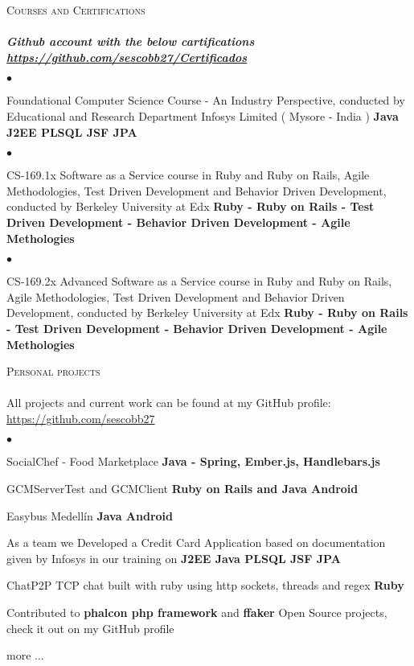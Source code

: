 \documentclass[a4paper]{article}
\newcommand{\lineunder}{\vspace*{-8pt} \\ \hspace*{-18pt} \hrulefill \\}
\newcommand{\header}[1]{{\hspace*{-15pt}\vspace*{6pt}
\textsc{#1}} \vspace*{-6pt} \lineunder}
\newenvironment{achievements}{\begin{list}{$\bullet$}{\topsep 0pt \itemsep
-2pt}}{\vspace*{4pt}\end{list}}
\newcommand{\programming}[1]{{\textbf{#1}}}
\newcommand{\emphasys}[1]{\textbf{\emph{#1}}}
\begin{document}
\newpage
\header{Courses and Certifications}
\emphasys{Github account with the below cartifications \url{https://github.com/sescobb27/Certificados}}
\begin{achievements}
\item Foundational Computer Science Course - An Industry Perspective, conducted by Educational and Research Department Infosys Limited ( Mysore - India )
\programming{Java J2EE PLSQL JSF JPA}
\end{achievements}
\begin{achievements}
\item{CS-169.1x Software as a Service course in Ruby and Ruby on Rails, Agile Methodologies, Test Driven Development and Behavior Driven Development, conducted by Berkeley University at Edx}
\programming{Ruby - Ruby on Rails - Test Driven Development - Behavior Driven Development - Agile Methologies}
\end{achievements}
\begin{achievements}
\item{CS-169.2x Advanced Software as a Service course in Ruby and Ruby on Rails, Agile Methodologies, Test Driven Development and Behavior Driven Development, conducted by Berkeley University at Edx}
\programming{Ruby - Ruby on Rails - Test Driven Development - Behavior Driven Development - Agile Methologies}
\end{achievements}

\header{Personal projects}
All projects and current work can be found at my GitHub profile: \url{https://github.com/sescobb27}
\begin{achievements}
\item{SocialChef - Food Marketplace} \programming{Java - Spring, Ember.js, Handlebars.js}
\item{GCMServerTest and GCMClient} \programming{Ruby on Rails and Java Android}
\item{Easybus Medell\'in }\programming{Java Android}
\item{As a team we Developed a Credit Card Application based on documentation given by Infosys in our training on \programming{J2EE Java PLSQL JSF JPA}}
\item{ChatP2P TCP chat built with ruby using http sockets, threads and regex \programming{Ruby}}
\item{Contributed to \programming{phalcon php framework} and \programming{ffaker} Open Source projects, check it out on my GitHub profile}
\item{more ...}
\end{achievements}
\end{document}
